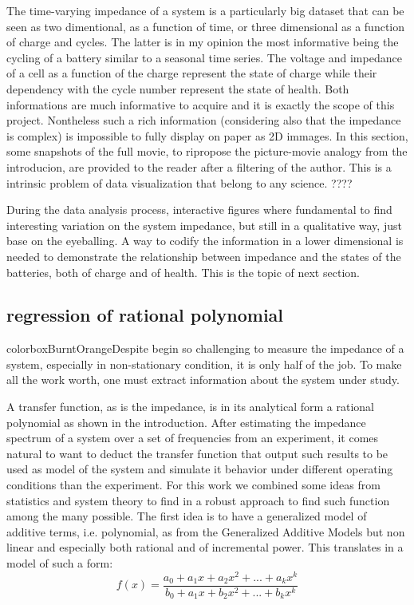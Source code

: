 The time-varying impedance of a system is a particularly big dataset that can be seen as two dimentional, as a function of time, or three dimensional as a function of charge and cycles. The latter is in my opinion the most informative being the cycling of a battery similar to a seasonal time series. The voltage and impedance of a cell as a function of the charge represent the state of charge while their dependency with the cycle number represent the state of health. Both informations are much informative to acquire and it is exactly the scope of this project. Nontheless such a rich information (considering also that the impedance is complex) is impossible to fully display on paper as 2D immages. In this section, some snapshots of the full movie, to ripropose the picture-movie analogy from the introducion, are provided to the reader after a filtering of the author. This is a intrinsic problem of data visualization that belong to any science. ????

During the data analysis process, interactive figures where fundamental to find interesting variation on the system impedance, but still in a qualitative way, just base on the eyeballing. A way to codify the information in a lower dimensional is needed to demonstrate the relationship between impedance and the states of the batteries, both of charge and of health. This is the topic of next section.

\subsection{regression of rational polynomial}

colorbox{BurntOrange}{Despite begin so challenging to measure the impedance of a system, especially in non-stationary condition, it is only half of the job. To make all the work worth, one must extract information about the system under study.}

A transfer function, as is the impedance, is in its analytical form a rational polynomial as shown in the introduction. After estimating the impedance spectrum of a system over a set of frequencies from an experiment, it comes natural to want to deduct the transfer function that output such results to be used as model of the system and simulate it behavior under different operating conditions than the experiment. For this work we combined some ideas from statistics and system theory to find in a robust approach to find such function among the many possible. The first idea is to have a generalized model of additive terms, i.e. polynomial, as from the Generalized Additive Models but non linear and especially both rational and of incremental power. This translates in a model of such a form:
\begin{equation}
    f(x) = \frac{a_0+a_1x+a_2x^2+...+a_kx^k}{b_0+a_1x+b_2x^2+...+b_kx^k}
\end{equation}

